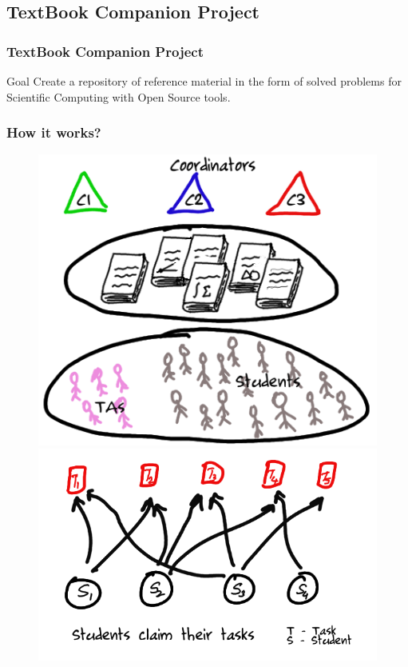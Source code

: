 \documentclass[compress,red]{beamer} %
\begin{document}
\subsection{TextBook Companion Project}

\begin{frame}
\frametitle{TextBook Companion Project}
\begin{definition}{Goal}
Create a repository of reference material in the form of solved problems for Scientific Computing with Open Source tools.
\end{definition}
\end{frame}

\begin{frame}
\frametitle{How it works?}
\begin{figure}[ht]
\begin{minipage}[b]{0.5\linewidth}
\centering
\includegraphics[scale=0.15]{1.png}
\end{minipage}
\hspace{0.5cm}
\begin{minipage}[b]{0.5\linewidth}
\centering
\includegraphics[scale=0.15]{2.png}

\end{minipage}
\end{figure}
\end{frame}
\end{document}

